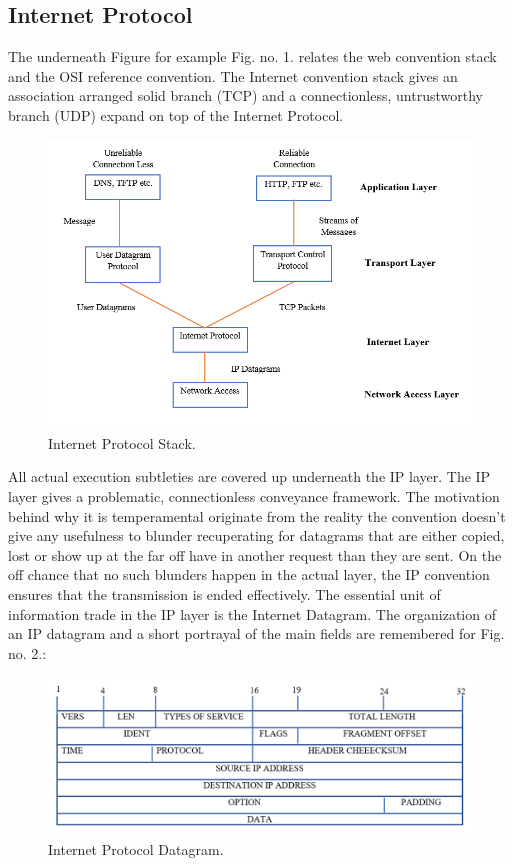 \documentclass[12pt,a4paper]{article}
\begin{document}
\subsection{Internet Protocol}
The underneath Figure for example Fig. no. 1. relates the web convention stack and the OSI reference convention. The Internet convention stack gives an association arranged solid branch (TCP) and a connectionless, untrustworthy branch (UDP) expand on top of the Internet Protocol.\\
 \begin{figure}[h]
 		\centering
				\includegraphics[scale=0.75]{1.1.png}	
			\caption{Internet Protocol Stack.}
			\label{fig:AP}
	\end{figure}
All actual execution subtleties are covered up underneath the IP layer. The IP layer gives a problematic, connectionless conveyance framework. The motivation behind why it is temperamental originate from the reality the convention doesn't give any usefulness to blunder recuperating for datagrams that are either copied, lost or show up at the far off have in another request than they are sent. On the off chance that no such blunders happen in the actual layer, the IP convention ensures that the transmission is ended effectively. 
The essential unit of information trade in the IP layer is the Internet Datagram. The organization of an IP datagram and a short portrayal of the main fields are remembered for Fig. no. 2.:\\
\begin{figure}[h]
 		\centering
				\includegraphics[scale=0.65]{1.2.png}	
			\caption{Internet Protocol Datagram.}
			\label{fig:AP}
	\end{figure}
 
\end{document}
